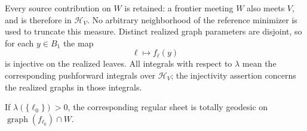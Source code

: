 Every source contribution on $W$ is retained: a frontier meeting $W$
also meets $V$, and is therefore in $\mathcal H_V$.  No arbitrary
neighborhood of the reference minimizer is used to truncate this
measure.  Distinct realized graph parameters are disjoint, so for each
$y\in B_1$ the map
\begin{equation}\label{var:injective-leaf-evaluation}
 \ell\longmapsto f_\ell(y)
\end{equation}
is injective on the realized leaves.  All integrals with respect to
$\lambda$ mean the corresponding pushforward integrals over
$\mathcal H_V$; the injectivity assertion concerns the realized
graphs in those integrals.

\begin{lemma}\label{var:atomic-leaves}
If $\lambda(\{\ell_0\})>0$, the corresponding regular sheet is
totally geodesic on $\operatorname{graph}(f_{\ell_0})\cap W$.
\end{lemma}

